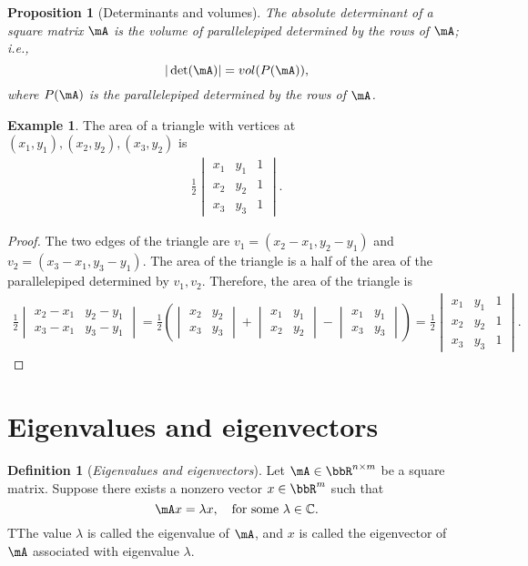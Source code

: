 \documentclass[11pt]{article}
\theoremstyle{plain}
\newtheorem{prop}{Proposition}
\theoremstyle{definition}
\newtheorem{defn}{Definition}
\newtheorem{example}{Example}
\begin{document}
\begin{prop}[Determinants and volumes]
The absolute determinant of a square matrix $\mA$ is the volume of parallelepiped determined by the rows of $\mA$; i.e.,
	\[ |\det(\mA)| = vol(P(\mA)), \]
	where $P(\mA)$ is the parallelepiped determined by the rows of $\mA$.
\end{prop}

\begin{example}
	The area of a triangle with vertices at $(x_1,y_1), (x_2,y_2), (x_3,y_2)$ is
	\begin{align}
		\frac{1}{2} \begin{vmatrix}
			x_1 & y_1 & 1\\
			x_2 & y_2 & 1\\
			x_3 & y_3 & 1
		\end{vmatrix}.
	\end{align}
	
	\begin{proof}
		The two edges of the triangle are $v_1 = (x_2 - x_1, y_2 -y_1)$ and $v_2 = (x_3 - x_1, y_3 -y_1)$. The area of the triangle is a half of the area of the parallelepiped determined by $v_1, v_2$. Therefore, the area of the triangle is 
		\begin{align}
			\frac{1}{2} \begin{vmatrix}
				x_2 - x_1 &  y_2 - y_1\\
				x_3 - x_1& y_3 -y_1
			\end{vmatrix} =  \frac{1}{2} \left(  \begin{vmatrix}
				x_2  &  y_2 \\
				x_3 & y_3
			\end{vmatrix} + \begin{vmatrix}
				x_1 &  y_1\\
				x_2& y_2
			\end{vmatrix}  - \begin{vmatrix}
				x_1 &  y_1\\
				x_3 & y_3 
			\end{vmatrix}    \right) = \frac{1}{2} \begin{vmatrix}
			x_1 & y_1 & 1\\
			x_2 & y_2 & 1\\
			x_3 & y_3 & 1
		\end{vmatrix}.
		\end{align}
	\end{proof}
\end{example}

\section{Eigenvalues and eigenvectors}
\begin{defn}[\textit{Eigenvalues and eigenvectors}]\label{def:eigen}
	Let $\mA \in \bbR^{n \times m}$ be a square matrix. Suppose there exists a nonzero vector $x \in \bbR^{m}$ such that
	\[ \mA x = \lambda x, \quad \text{for some } \lambda \in \mathbb{C}. \]
	TThe value $\lambda$ is called the eigenvalue of $\mA$, and $x$ is called the eigenvector of $\mA$ associated with eigenvalue $\lambda$.
\end{defn}
\end{document}
